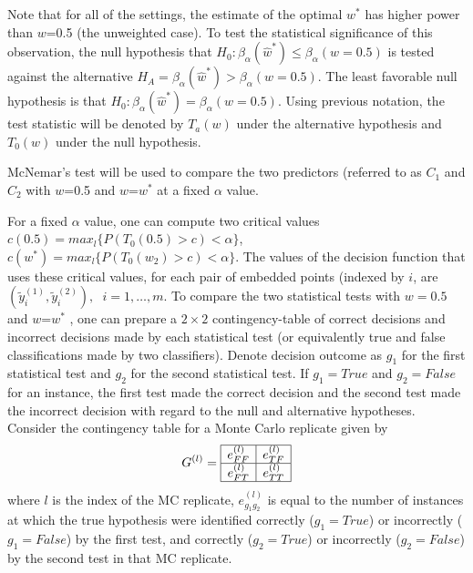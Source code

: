 \documentclass[11pt]{article} %
\begin{document}
Note that  for all of the settings, the estimate of the optimal $w^{*}$ has  higher power than $w$=0.5 (the unweighted case).
To test the statistical significance of this observation,   the null hypothesis that  $H_{0}: \beta_{\alpha}({\hat{w}^*})\leq\beta_{\alpha}({w=0.5})$  is tested against the alternative $H_{A}=\beta_{\alpha}({\hat{w}^*})>\beta_{\alpha}({w=0.5})$.  The least favorable null hypothesis is that  $H_{0}: \beta_{\alpha}({\hat{w}^*})=\beta_{\alpha}({w=0.5})$.
Using previous notation,  the test statistic will be denoted by $T_a(w)$ under the alternative hypothesis and $T_0(w)$ under the null hypothesis.

McNemar's test will be used to compare the two predictors (referred to as $C_1$ and $C_2$ with $w$=0.5 and $w$=$w^*$ at a fixed $\alpha$ value.

For a fixed $\alpha$ value, one can compute two critical values $c(0.5)=max_l \{  P(T_0(0.5)>c)<\alpha\}$,  $c(w^*)=max_l \{  P(T_0(w_2)>c)<\alpha\}$. The values of the decision function that uses these critical  values, for each pair of embedded points (indexed by $i$, are  $(\tilde{y}_i^{(1)},\tilde{y}_i^{(2)}),\hspace{7pt}i=1,\ldots,m$. To compare the  two statistical tests with  $w=0.5$ and $w$=$w^*$  , one can prepare a $2\times 2$ contingency-table of correct decisions and incorrect decisions made by each statistical test (or equivalently true and false classifications made by two classifiers). Denote decision outcome as $g_1$ for the first statistical test and $g_2$ for the second statistical test. If $g_1=True$ and $g_2=False$ for an instance,  the first test made the correct decision and the second test made the incorrect decision with regard to the null and alternative hypotheses.
Consider the contingency table for a Monte Carlo replicate given by $$G^{(l)}= \begin{array}{|c|c|}
      \hline
       e_{FF}^{(l)} & e_{TF}^{(l)}\\
      \hline
       e_{FT}^{(l)} & e_{TT}^{(l)}\\
      \hline
      \end{array}      $$  where $l$ is the index of the MC replicate, $e_{g_1g_2}^{(l)}$ is equal to the number of instances at which the true hypothesis were identified  correctly ($g_1=True$) or incorrectly ($g_1=False$) by the first test, and correctly ($g_2=True$) or incorrectly ($g_2=False$) by the second test in that MC replicate.
\end{document}
